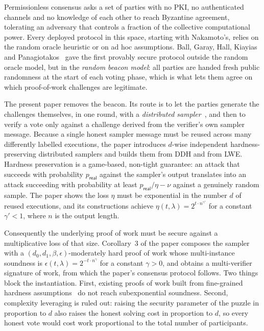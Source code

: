 \documentclass{aicr-conjecture}
\begin{document}
Permissionless consensus asks a set of parties with no PKI, no authenticated channels and no knowledge of each other to reach Byzantine agreement, tolerating an adversary that controls a fraction of the collective computational power. Every deployed protocol in this space, starting with Nakamoto's, relies on the random oracle heuristic or on ad hoc assumptions. Ball, Garay, Hall, Kiayias and Panagiotakos~\cite{BGH24a} gave the first provably secure protocol outside the random oracle model, but in the \emph{random beacon model}: all parties are handed fresh public randomness at the start of each voting phase, which is what lets them agree on which proof-of-work challenges are legitimate.

The present paper removes the beacon. Its route is to let the parties generate the challenges themselves, in one round, with a \emph{distributed sampler}~\cite{AWZ23}, and then to verify a vote only against a challenge derived from the verifier's own sampler message. Because a single honest sampler message must be reused across many differently labelled executions, the paper introduces $d$-wise independent hardness-preserving distributed samplers and builds them from DDH and from LWE. Hardness preservation is a game-based, non-tight guarantee: an attack that succeeds with probability $p_{\mathsf{real}}$ against the sampler's output translates into an attack succeeding with probability at least $p_{\mathsf{real}}/\eta - \nu$ against a genuinely random sample. The paper shows the loss $\eta$ must be exponential in the number $d$ of reused executions, and its constructions achieve $\eta(t,\lambda) = 2^{t\cdot n^{\gamma'}}$ for a constant $\gamma' < 1$, where $n$ is the output length.

Consequently the underlying proof of work must be secure against a multiplicative loss of that size. Corollary~3 of the paper composes the sampler with a $(d_0,d_1,\beta,\epsilon)$-moderately hard proof of work whose multi-instance soundness is $\epsilon(t,\lambda) = 2^{-t\cdot n^{\gamma}}$ for a constant $\gamma>0$, and obtains a multi-verifier signature of work, from which the paper's consensus protocol follows. Two things block the instantiation. First, existing proofs of work built from fine-grained hardness assumptions~\cite{BGH24a} do not reach subexponential soundness. Second, complexity leveraging is ruled out: raising the security parameter of the puzzle in proportion to $d$ also raises the honest solving cost in proportion to $d$, so every honest vote would cost work proportional to the total number of participants.
\end{document}
